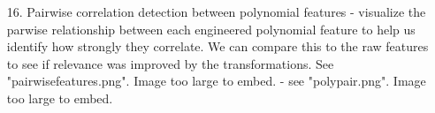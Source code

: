 \documentclass[manuscript,screen,review, nonacm]{acmart}
\begin{document}
\begin{itemize}
    \item[16.] Pairwise correlation detection between polynomial features - visualize the parwise relationship between each engineered polynomial feature to help us identify how strongly they correlate. We can compare this to the raw features to see if relevance was improved by the transformations. See "pairwisefeatures.png". Image too large to embed. - see "polypair.png". Image too large to embed.
        



\end{itemize}
\end{document}
